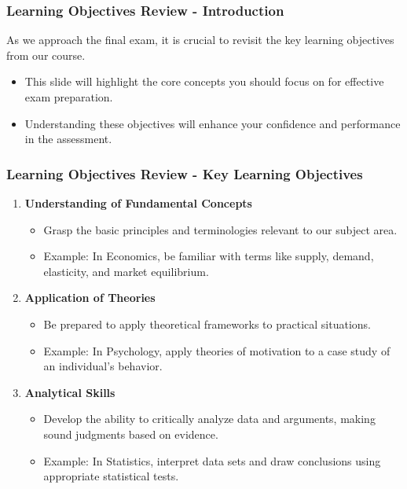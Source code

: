 \documentclass{beamer}
\begin{document}
\begin{frame}[fragile]
    \frametitle{Learning Objectives Review - Introduction}
    As we approach the final exam, it is crucial to revisit the key learning objectives from our course. 
    \begin{itemize}
        \item This slide will highlight the core concepts you should focus on for effective exam preparation.
        \item Understanding these objectives will enhance your confidence and performance in the assessment.
    \end{itemize}
\end{frame}

\begin{frame}[fragile]
    \frametitle{Learning Objectives Review - Key Learning Objectives}
    \begin{enumerate}
        \item \textbf{Understanding of Fundamental Concepts}
        \begin{itemize}
            \item Grasp the basic principles and terminologies relevant to our subject area.
            \item Example: In Economics, be familiar with terms like supply, demand, elasticity, and market equilibrium.
        \end{itemize}

        \item \textbf{Application of Theories}
        \begin{itemize}
            \item Be prepared to apply theoretical frameworks to practical situations.
            \item Example: In Psychology, apply theories of motivation to a case study of an individual's behavior.
        \end{itemize}

        \item \textbf{Analytical Skills}
        \begin{itemize}
            \item Develop the ability to critically analyze data and arguments, making sound judgments based on evidence.
            \item Example: In Statistics, interpret data sets and draw conclusions using appropriate statistical tests.
        \end{itemize}
    \end{enumerate}
\end{frame}
\end{document}

